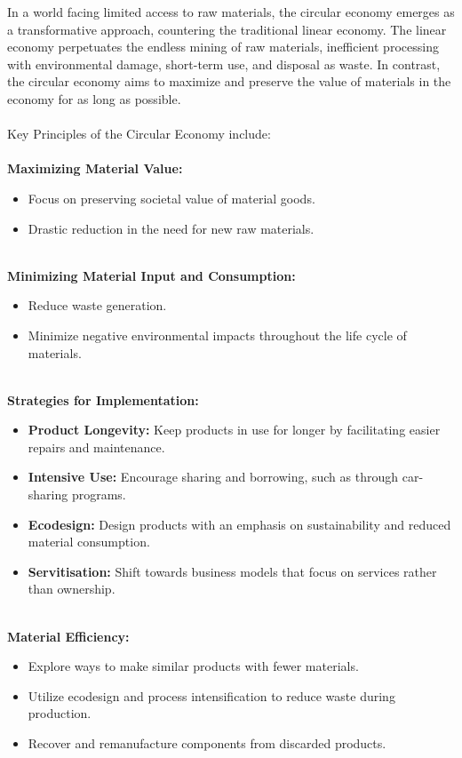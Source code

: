 \documentclass[../summary.tex]{subfiles}
\begin{document}
In a world facing limited access to raw materials, the circular economy emerges as a transformative approach, countering the traditional linear economy. The linear economy perpetuates the endless mining of raw materials, inefficient processing with environmental damage, short-term use, and disposal as waste. In contrast, the circular economy aims to maximize and preserve the value of materials in the economy for as long as possible.\\
\\
Key Principles of the Circular Economy include:\\
\\
\textbf{Maximizing Material Value:}
\begin{itemize}
	\itemsep0em 
	\item Focus on preserving societal value of material goods.
	\item Drastic reduction in the need for new raw materials.
\end{itemize}
\ \\
\textbf{Minimizing Material Input and Consumption:}
\begin{itemize}
	\itemsep0em 
	\item Reduce waste generation.
	\item Minimize negative environmental impacts throughout the life cycle of materials.
\end{itemize}
\ \\
\textbf{Strategies for Implementation:}
\begin{itemize}
	\itemsep0em 
	\item \textbf{Product Longevity:} Keep products in use for longer by facilitating easier repairs and maintenance.
	\item \textbf{Intensive Use:} Encourage sharing and borrowing, such as through car-sharing programs.
	\item \textbf{Ecodesign:} Design products with an emphasis on sustainability and reduced material consumption.
	\item \textbf{Servitisation:} Shift towards business models that focus on services rather than ownership.
\end{itemize}
\ \\
\textbf{Material Efficiency:}
\begin{itemize}
	\itemsep0em 
	\item Explore ways to make similar products with fewer materials.
	\item Utilize ecodesign and process intensification to reduce waste during production.
	\item Recover and remanufacture components from discarded products.
\end{itemize}
\end{document}
